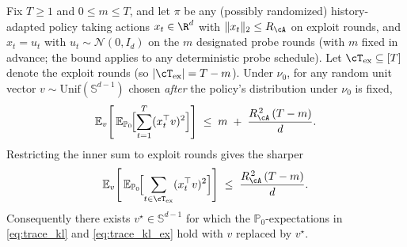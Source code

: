 \begin{lemma}
\label{lem:trace_kl}
Fix $T\ge 1$ and $0\le m\le T$, and let $\pi$ be any (possibly
randomized) history-adapted policy taking actions $x_t\in\R^d$ with
$\|x_t\|_2\le R_\cA$ on exploit rounds, and $x_t = u_t$ with
$u_t \sim \mathcal N(0,I_d)$ on the $m$ designated probe rounds (with
$m$ fixed in advance; the bound applies to any deterministic probe
schedule). Let $\cT_{\mathrm{ex}}\subseteq[T]$ denote the exploit
rounds (so $|\cT_{\mathrm{ex}}|=T-m$). Under $\nu_0$, for any random
unit vector $v\sim\mathrm{Unif}(\mathbb S^{d-1})$ chosen
\emph{after} the policy's distribution under $\nu_0$ is fixed,
\begin{equation}
\mathbb E_v\!\left[\,\mathbb E_{\mathbb P_0}\!\Bigl[\sum_{t=1}^T(x_t^\top v)^2\Bigr]\right]
\;\le\; m \;+\; \frac{R_\cA^{\,2}\,(T-m)}{d}.
\label{eq:trace_kl}
\end{equation}
Restricting the inner sum to exploit rounds gives the sharper
\begin{equation}
\mathbb E_v\!\left[\,\mathbb E_{\mathbb P_0}\!\Bigl[\sum_{t\in\cT_{\mathrm{ex}}}(x_t^\top v)^2\Bigr]\right]
\;\le\; \frac{R_\cA^{\,2}\,(T-m)}{d}.
\label{eq:trace_kl_ex}
\end{equation}
Consequently there exists $v^\star\in\mathbb S^{d-1}$ for which the
$\mathbb P_0$-expectations in \eqref{eq:trace_kl} and
\eqref{eq:trace_kl_ex} hold with $v$ replaced by $v^\star$.
\end{lemma}
